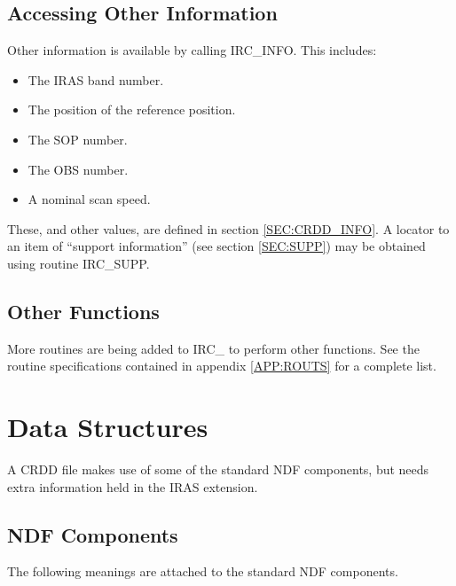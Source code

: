 \subsection {Accessing Other Information}
Other information is available by calling IRC\_INFO. This includes:

\begin{itemize}

\item The IRAS band number.

\item The position of the reference position.

\item The SOP number.

\item The OBS number.

\item A nominal scan speed.

\end{itemize}

These, and other values, are defined in section \ref {SEC:CRDD_INFO}. A locator
to an item of ``support information'' (see section \ref{SEC:SUPP}) may be
obtained using routine IRC\_SUPP. 

\subsection {Other Functions}
More routines are being added to IRC\_ to perform other functions. See
the routine specifications contained in appendix \ref {APP:ROUTS} for
a complete list.

\section {Data Structures}
A CRDD file makes use of some of the standard NDF components, but 
needs extra information held in the IRAS extension.

\subsection {NDF Components}
The following meanings are attached to the standard NDF components.

